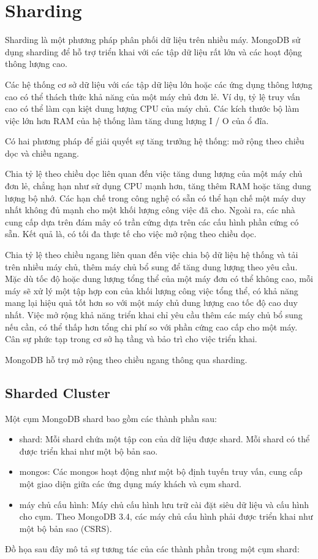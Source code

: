\chapter{Sharding} 
Sharding là một phương pháp phân phối dữ liệu trên nhiều máy. MongoDB sử dụng sharding để hỗ trợ triển khai với các tập dữ liệu rất lớn và các hoạt động thông lượng cao.

Các hệ thống cơ sở dữ liệu với các tập dữ liệu lớn hoặc các ứng dụng thông lượng cao có thể thách thức khả năng của một máy chủ đơn lẻ. Ví dụ, tỷ lệ truy vấn cao có thể làm cạn kiệt dung lượng CPU của máy chủ. Các kích thước bộ làm việc lớn hơn RAM của hệ thống làm tăng dung lượng I / O của ổ đĩa.

Có hai phương pháp để giải quyết sự tăng trưởng hệ thống: mở rộng theo chiều dọc và chiều ngang.

Chia tỷ lệ theo chiều dọc liên quan đến việc tăng dung lượng của một máy chủ đơn lẻ, chẳng hạn như sử dụng CPU mạnh hơn, tăng thêm RAM hoặc tăng dung lượng bộ nhớ. Các hạn chế trong công nghệ có sẵn có thể hạn chế một máy duy nhất không đủ mạnh cho một khối lượng công việc đã cho. Ngoài ra, các nhà cung cấp dựa trên đám mây có trần cứng dựa trên các cấu hình phần cứng có sẵn. Kết quả là, có tối đa thực tế cho việc mở rộng theo chiều dọc.

Chia tỷ lệ theo chiều ngang liên quan đến việc chia bộ dữ liệu hệ thống và tải trên nhiều máy chủ, thêm máy chủ bổ sung để tăng dung lượng theo yêu cầu. Mặc dù tốc độ hoặc dung lượng tổng thể của một máy đơn có thể không cao, mỗi máy sẽ xử lý một tập hợp con của khối lượng công việc tổng thể, có khả năng mang lại hiệu quả tốt hơn so với một máy chủ dung lượng cao tốc độ cao duy nhất. Việc mở rộng khả năng triển khai chỉ yêu cầu thêm các máy chủ bổ sung nếu cần, có thể thấp hơn tổng chi phí so với phần cứng cao cấp cho một máy. Cân  sự phức tạp trong cơ sở hạ tầng và bảo trì cho việc triển khai.

MongoDB hỗ trợ mở rộng theo chiều ngang thông qua sharding.

\section{Sharded Cluster}
Một cụm MongoDB shard bao gồm các thành phần sau:

\begin{itemize}
\item shard: Mỗi shard chứa một tập con của dữ liệu được shard. Mỗi shard có thể được triển khai như một bộ bản sao.
\item mongos: Các mongos hoạt động như một bộ định tuyến truy vấn, cung cấp một giao diện giữa các ứng dụng máy khách và cụm shard.
\item máy chủ cấu hình: Máy chủ cấu hình lưu trữ cài đặt siêu dữ liệu và cấu hình cho cụm. Theo MongoDB 3.4, các máy chủ cấu hình phải được triển khai như một bộ bản sao (CSRS).
\end{itemize}
Đồ họa sau đây mô tả sự tương tác của các thành phần trong một cụm shard:

